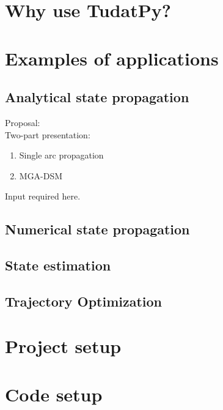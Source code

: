 \documentclass[]{IAC_style_updated}
\begin{document}
\section{Why use TudatPy?}
    

\section{Examples of applications}
    

    \subsection{Analytical state propagation}
    
    Proposal: \\
    Two-part presentation: 
    \begin{enumerate}
        \item Single arc propagation
        \item MGA-DSM
    \end{enumerate}
    \lbrack Input required here.\rbrack

    \subsection{Numerical state propagation}
    

    \subsection{State estimation}
    

    \subsection{Trajectory Optimization}
    
    

\section{Project setup}
    

\section{Code setup}
    
\end{document}
